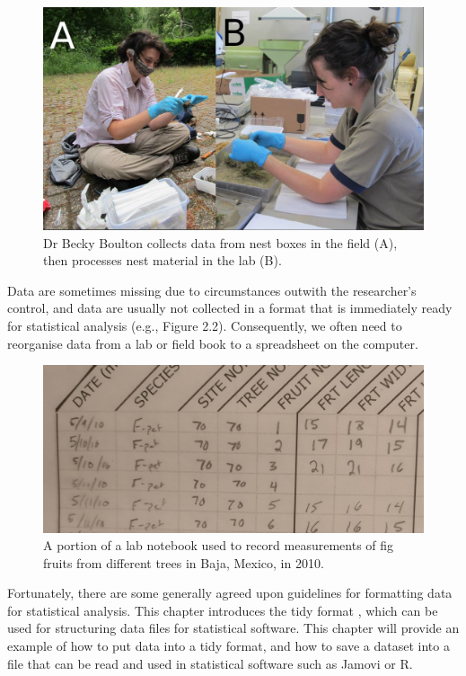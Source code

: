 \documentclass[
]{scrbook}
\begin{document}
\begin{figure}
\includegraphics[width=1\linewidth]{img/becky_field} \caption{Dr Becky Boulton collects data from nest boxes in the field (A), then processes nest material in the lab (B).}\label{fig:unnamed-chunk-4}
\end{figure}

Data are sometimes missing due to circumstances outwith the researcher's control, and data are usually not collected in a format that is immediately ready for statistical analysis (e.g., Figure 2.2).
Consequently, we often need to reorganise data from a lab or field book to a spreadsheet on the computer.

\begin{figure}
\includegraphics[width=1\linewidth]{img/handwritten_data} \caption{A portion of a lab notebook used to record measurements of fig fruits from different trees in Baja, Mexico, in 2010.}\label{fig:unnamed-chunk-5}
\end{figure}

Fortunately, there are some generally agreed upon guidelines for formatting data for statistical analysis.
This chapter introduces the tidy format \citep{Wickham2014}, which can be used for structuring data files for statistical software.
This chapter will provide an example of how to put data into a tidy format, and how to save a dataset into a file that can be read and used in statistical software such as Jamovi or R.
\end{document}
